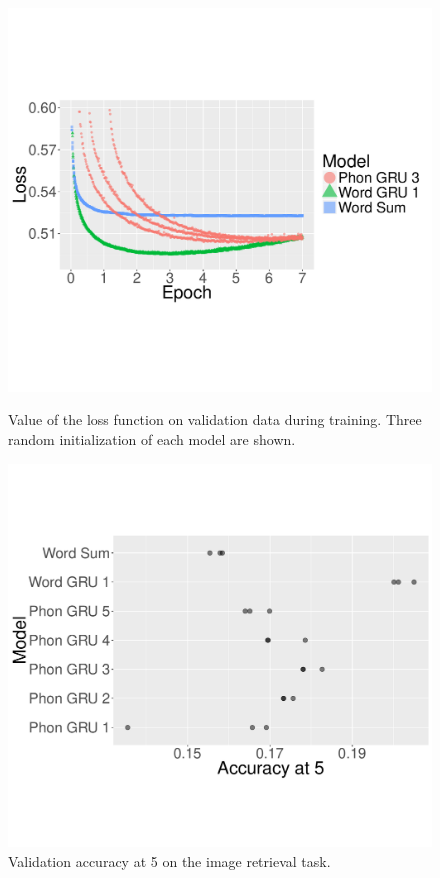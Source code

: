 \begin{figure}
    \centering
  \begin{minipage}{0.48\textwidth}
    \includegraphics[scale=0.32]{loss-zoom.pdf}
    \caption{Value of the loss function on validation data during
      training. Three random initialization of each model are shown.}
    \label{fig:loss}
  \end{minipage}
\hspace{0.3cm}
  \begin{minipage}{0.48\textwidth}
    \includegraphics[scale=0.32]{accat5.pdf}
    \caption{Validation accuracy at 5 on the image retrieval task.}
    \label{fig:accat5}
  \end{minipage}
\end{figure}

